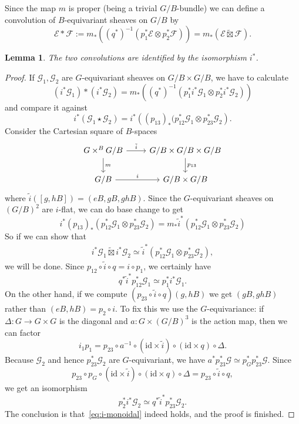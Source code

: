 \documentclass[11pt]{amsart}
\newtheorem{lemma}[dummy]{Lemma}
\theoremstyle{definition}
\newcommand{\Gc}{\mathcal{G}}
\newcommand{\Ec}{\mathcal{E}}
\newcommand{\Fc}{\mathcal{F}}
\numberwithin{equation}{subsection}
\numberwithin{figure}{subsection}
\begin{document}
Since the map $m$ is proper (being a trivial $G/B$-bundle) we can define a convolution of $B$-equivariant sheaves on $G/B$ by
$$
\Ec*\Fc := m_*\left((q^*)^{-1}(p_1^*\Ec\otimes p_2^*\Fc)\right) = m_*\left(\Ec\widetilde\boxtimes\Fc\right).
$$

\begin{lemma}
The two convolutions are identified by the isomorphism $i^*$.
\end{lemma}

\begin{proof}
If $\Gc_1,\Gc_2$ are $G$-equivariant sheaves on $G/B\times G/B$, we have to calculate  
$$
(i^*\Gc_1)*(i^*\Gc_2)=m_*\left((q^*)^{-1}\left(p_1^*i^*\Gc_1 \otimes p_2^*i^*\Gc_2\right)\right)
$$
and compare it against
$$
i^*\left(\Gc_1\star\Gc_2\right) = i^*\left( (p_{13})_*(p_{12}^*\Gc_1\otimes p_{23}^*\Gc_2\right).
$$
Consider the Cartesian square of $B$-spaces
$$
\begin{tikzcd}
 G \times^B G/B\arrow{r}{\tilde i} \arrow{d}{m}& G/B\times G/B\times G/B\arrow{d}{p_{13}}\\
G/B \arrow{r}{i}&  G/B\times G/B
\end{tikzcd}
$$
where $\tilde i([g,hB]) = (eB, gB, ghB).$
{Since the $G$-equivariant sheaves on $(G/ B)^2$ are $i$-flat, }
we can do base change to get
$$
i^* (p_{13})_*\left(p_{12}^*\Gc_1\otimes p_{23}^*\Gc_2\right)= m_*\tilde i^*\left(p_{12}^*\Gc_1\otimes p_{23}^*\Gc_2\right)
$$
So if we can show that 
\begin{align}
\label{eq:i-monoidal}
i^*\Gc_1\widetilde{\boxtimes}i^*\Gc_2 \simeq \tilde i^*\left(p_{12}^*\Gc_1\otimes p_{23}^*\Gc_2\right),
\end{align}
we will be done. Since $p_{12}\circ \tilde i\circ q=i\circ p_1$, we certainly have
$$
q^*\tilde i^*p_{12}^*\Gc_1 \simeq p_{1}^*i^*\Gc_1.
$$ On the other hand, if we compute $(p_{23}\circ \tilde i\circ q)(g,hB)$ we get $(gB,ghB)$ rather than $(eB,hB)=p_2\circ i$. To fix this we use the $G$-equivariance: if $\Delta:G\rightarrow G\times G$ is the diagonal and $a: G\times (G/B)^3$ is the action map, then we can factor
$$
i_1p_1=p_{23}\circ a^{-1}\circ (\mathrm{id}\times \tilde i)\circ (\mathrm{id}\times q)\circ \Delta.
$$
Because $\Gc_2$ and hence $p_{23}^*\Gc_2$ are $G$-equivariant, we have $a^*p_{23}^*\Gc\simeq p_G^*p_{23}^*\Gc$. Since
$$
p_{23}\circ p_G \circ (\mathrm{id}\times \tilde i)\circ (\mathrm{id}\times q)\circ \Delta = p_{23}\circ \tilde i\circ q,
$$
we get an isomorphism
$$
p_2^*i^*\Gc_2 \simeq q^*\tilde i^*p_{23}^*\Gc_2.
$$
The conclusion is that~\eqref{eq:i-monoidal} indeed holds,
and the proof is finished.
\end{proof}
\end{document}
